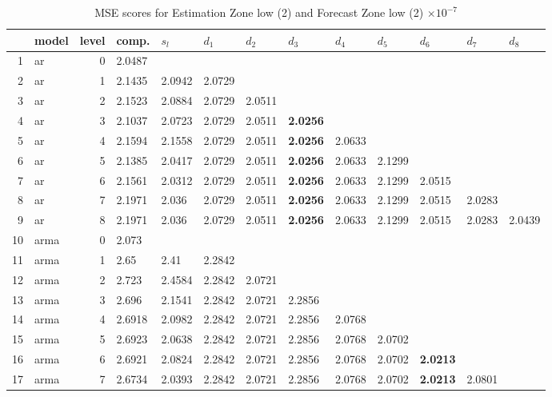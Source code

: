 \documentclass[10pt,a4paper]{article}
\begin{document}
\begin{table}[ht]
\centering
\caption{MSE scores for Estimation Zone low (2) and Forecast Zone low (2) $ \times 10^{-7}$} 
\begin{tabular}{rlrllllllllll}
  \hline
 & model & level & comp. & $s_l$ & $d_1$ & $d_2$ & $d_3$ & $d_4$ & $d_5$ & $d_6$ & $d_7$ & $d_8$ \\ 
  \hline
1 & ar &     0 & 2.0487 &  &  &  &  &  &  &  &  &  \\ 
  2 & ar &     1 & 2.1435 & 2.0942 & 2.0729 &  &  &  &  &  &  &  \\ 
  3 & ar &     2 & 2.1523 & 2.0884 & 2.0729 & 2.0511 &  &  &  &  &  &  \\ 
  4 & ar &     3 & 2.1037 & 2.0723 & 2.0729 & 2.0511 & \textbf{2.0256} &  &  &  &  &  \\ 
  5 & ar &     4 & 2.1594 & 2.1558 & 2.0729 & 2.0511 & \textbf{2.0256} & 2.0633 &  &  &  &  \\ 
  6 & ar &     5 & 2.1385 & 2.0417 & 2.0729 & 2.0511 & \textbf{2.0256} & 2.0633 & 2.1299 &  &  &  \\ 
  7 & ar &     6 & 2.1561 & 2.0312 & 2.0729 & 2.0511 & \textbf{2.0256} & 2.0633 & 2.1299 & 2.0515 &  &  \\ 
  8 & ar &     7 & 2.1971 & 2.036 & 2.0729 & 2.0511 & \textbf{2.0256} & 2.0633 & 2.1299 & 2.0515 & 2.0283 &  \\ 
  9 & ar &     8 & 2.1971 & 2.036 & 2.0729 & 2.0511 & \textbf{2.0256} & 2.0633 & 2.1299 & 2.0515 & 2.0283 & 2.0439 \\ 
   \hline
10 & arma &     0 & 2.073 &  &  &  &  &  &  &  &  &  \\ 
  11 & arma &     1 & 2.65 & 2.41 & 2.2842 &  &  &  &  &  &  &  \\ 
  12 & arma &     2 & 2.723 & 2.4584 & 2.2842 & 2.0721 &  &  &  &  &  &  \\ 
  13 & arma &     3 & 2.696 & 2.1541 & 2.2842 & 2.0721 & 2.2856 &  &  &  &  &  \\ 
  14 & arma &     4 & 2.6918 & 2.0982 & 2.2842 & 2.0721 & 2.2856 & 2.0768 &  &  &  &  \\ 
  15 & arma &     5 & 2.6923 & 2.0638 & 2.2842 & 2.0721 & 2.2856 & 2.0768 & 2.0702 &  &  &  \\ 
  16 & arma &     6 & 2.6921 & 2.0824 & 2.2842 & 2.0721 & 2.2856 & 2.0768 & 2.0702 & \textbf{2.0213} &  &  \\ 
  17 & arma &     7 & 2.6734 & 2.0393 & 2.2842 & 2.0721 & 2.2856 & 2.0768 & 2.0702 & \textbf{2.0213} & 2.0801 &  \\ 

\end{tabular}
\end{table}
\end{document}
